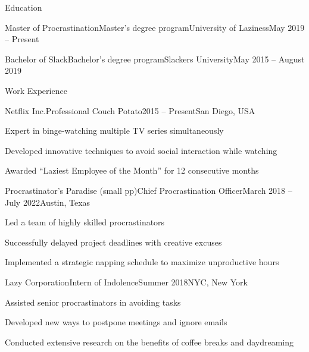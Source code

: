 \documentclass[]{kyvernitis-resume}
\begin{document}
\resumeheader
{}
{}
{}
{}
{}
{}

\begin{section}{Education}
    \begin{subsectionnobullet}{Master of Procrastination}{Master's degree program}{University of Laziness}{May 2019 -- Present}
    \end{subsectionnobullet}
    
    \begin{subsectionnobullet}{Bachelor of Slack}{Bachelor's degree program}{Slackers University}{May 2015 -- August 2019}
    \end{subsectionnobullet}
\end{section}

\begin{section}{Work Experience}
    \begin{subsection}{Netflix Inc.}{Professional Couch Potato}{2015 -- Present}{San Diego, USA}
        \item Expert in binge-watching multiple TV series simultaneously
        \item Developed innovative techniques to avoid social interaction while watching
        \item Awarded ``Laziest Employee of the Month'' for 12 consecutive months
    \end{subsection}
    
    \begin{subsection}{Procrastinator's Paradise (small pp)}{Chief Procrastination Officer}{March 2018 -- July 2022}{Austin, Texas}
        \item Led a team of highly skilled procrastinators
        \item Successfully delayed project deadlines with creative excuses
        \item Implemented a strategic napping schedule to maximize unproductive hours
    \end{subsection}
    
    \begin{subsection}{Lazy Corporation}{Intern of Indolence}{Summer 2018}{NYC, New York}
        \item Assisted senior procrastinators in avoiding tasks
        \item Developed new ways to postpone meetings and ignore emails
        \item Conducted extensive research on the benefits of coffee breaks and daydreaming
    \end{subsection}
    
\end{section}
\end{document}
